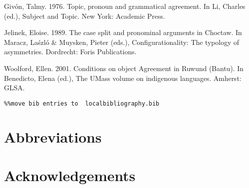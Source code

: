 \documentclass[output=paper]{langsci/langscibook}
\begin{document}
Givón, Talmy. 1976. Topic, pronoun and grammatical agreement. In Li, Charles (ed.), Subject and Topic. New York: Academic Press.

Jelinek, Eloise. 1989. The case split and pronominal arguments in Choctaw. In Maracz, La\' szló & Muysken, Pieter (eds.), Configurationality: The typology of asymmetries. Dordrecht: Foris Publications.




Woolford, Ellen. 2001. Conditions on object Agreement in Ruwund (Bantu). In Benedicto, Elena (ed.), The UMass volume on indigenous languages. Amherst: GLSA.




\begin{verbatim}%%move bib entries to  localbibliography.bib
\end{verbatim}

\section*{Abbreviations}
\section*{Acknowledgements}

\printbibliography[heading=subbibliography,notkeyword=this]
\end{document}

